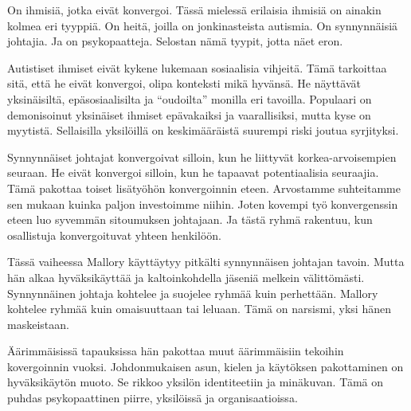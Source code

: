 On ihmisiä, jotka eivät konvergoi. Tässä mielessä erilaisia ihmisiä on ainakin kolmea eri tyyppiä. On heitä, joilla on jonkinasteista autismia. On synnynnäisiä johtajia. Ja on psykopaatteja. Selostan nämä tyypit, jotta näet eron.

Autistiset ihmiset eivät kykene lukemaan sosiaalisia vihjeitä. Tämä tarkoittaa sitä, että he eivät konvergoi, olipa konteksti mikä hyvänsä. He näyttävät yksinäisiltä, epäsosiaalisilta ja ``oudoilta'' monilla eri tavoilla. Populaari on demonisoinut yksinäiset ihmiset epävakaiksi ja vaarallisiksi, mutta kyse on myytistä. Sellaisilla yksilöillä on keskimääräistä suurempi riski joutua syrjityksi.

Synnynnäiset johtajat konvergoivat silloin, kun he liittyvät korkea-arvoisempien seuraan. He eivät konvergoi silloin, kun he tapaavat potentiaalisia seuraajia. Tämä pakottaa toiset lisätyöhön konvergoinnin eteen. Arvostamme suhteitamme sen mukaan kuinka paljon investoimme niihin. Joten kovempi työ konvergenssin eteen luo syvemmän sitoumuksen johtajaan. Ja tästä ryhmä rakentuu, kun osallistuja konvergoituvat yhteen henkilöön.

Tässä vaiheessa Mallory käyttäytyy pitkälti synnynnäisen johtajan tavoin. Mutta hän alkaa hyväksikäyttää ja kaltoinkohdella jäseniä melkein välittömästi. Synnynnäinen johtaja kohtelee ja suojelee ryhmää kuin perhettään. Mallory kohtelee ryhmää kuin omaisuuttaan tai leluaan. Tämä on narsismi, yksi hänen maskeistaan.

Äärimmäisissä tapauksissa hän pakottaa muut äärimmäisiin tekoihin kovergoinnin vuoksi. Johdonmukaisen asun, kielen ja käytöksen pakottaminen on hyväksikäytön muoto. Se rikkoo yksilön identiteetiin ja minäkuvan. Tämä on puhdas psykopaattinen piirre, yksilöissä ja organisaatioissa.































